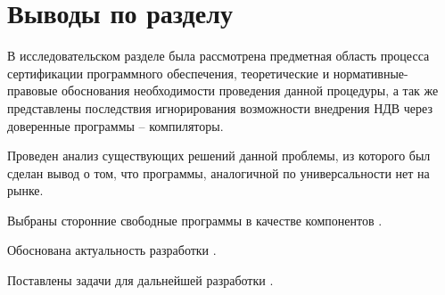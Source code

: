 \section{Выводы по разделу}\label{sec:ch1/sec5}
В исследовательском разделе была рассмотрена предметная область процесса
сертификации программного обеспечения, теоретические и нормативные-правовые 
обоснования необходимости проведения данной процедуры, а так же представлены
последствия игнорирования возможности внедрения НДВ  через доверенные программы --
компиляторы.

Проведен анализ существующих решений данной проблемы, из которого был сделан
вывод о том, что программы, аналогичной по универсальности {\ProgModule} нет на рынке.

Выбраны сторонние свободные программы в качестве компонентов {\ProgModule}.

Обоснована актуальность разработки {\ProgModule}.

Поставлены задачи для дальнейшей разработки {\ProgModule}.
